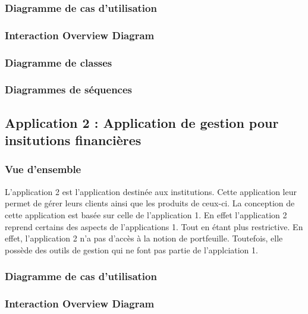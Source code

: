 \documentclass{article}
\begin{document}
		\subsubsection{Diagramme de cas d'utilisation}
				
				
		\newpage
		\subsubsection{Interaction Overview Diagram}
		
				
		
		\subsubsection{Diagramme de classes}

		\subsubsection{Diagrammes de séquences}
		
	\subsection{Application 2 : Application de gestion pour insitutions financières}

		\subsubsection{Vue d'ensemble}
			L'application 2 est l'application destinée aux institutions. Cette application leur permet de gérer 
			leurs clients ainsi que les produits de ceux-ci. La conception de cette application est basée sur celle 
			de l'application 1. En effet l'application 2 reprend certains des aspects de l'applications 1. Tout 
			en étant plus restrictive. En effet, l'application 2 n'a pas d'accès à la notion de portfeuille. 
			Toutefois, elle possède des outils de gestion qui ne font pas partie de l'applciation 1.
		\subsubsection{Diagramme de cas d'utilisation}
			
		\newpage
		\subsubsection{Interaction Overview Diagram}
\end{document}
